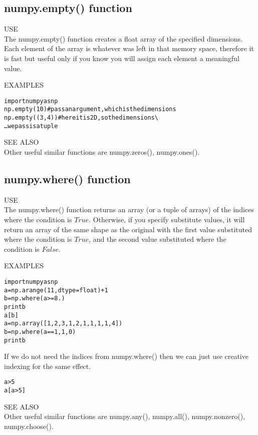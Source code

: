 \subsection{ {\sf numpy.empty() } function}
{\color{blue} {\sf\small USE}} \\
The {\sf\small numpy.empty()} function creates a float array of the
specified dimensions. Each element of the array is whatever was left
in that memory space, therefore it is fast but useful only if you know
you will assign each element a meaningful value.
  
{\color{blue} {\sf\small EXAMPLES}} 
\begin{alltt}
\pytab import numpy as np 
\pytab np.empty(10)   #pass an argument, which is the dimensions
\pytab np.empty((3,4)) #here it is 2D, so the dimensions \textbackslash
\ldots    we pass is a tuple
\end{alltt}

{\color{blue} {\sf\small SEE ALSO}} \\
Other useful similar functions are {\sf\small numpy.zeros(), numpy.ones()}.

\subsection{ {\sf numpy.where() } function}
{\color{blue} {\sf\small USE}} \\
The {\sf\small numpy.where()} function returns an array (or a tuple of
arrays) of the indices where the condition is $True$.  Otherwise, if you
specify substitute values, it will return an array of the same shape as
the original with the first value substituted where the condition is
$True$, and the second value substituted where the condition is $False$.
  
{\color{blue} {\sf\small EXAMPLES}} 
\begin{alltt}
\pytab import numpy as np
\pytab a = np.arange(11, dtype=float) + 1
\pytab b = np.where(a >= 8.) 
\pytab print b 
\pytab a[b] 
\pytab a = np.array([1,2,3,1,2,1,1,1,1,4]) 
\pytab b = np.where(a == 1, 1,0) 
\pytab print b 
\end{alltt}
If we do not need the indices from {\sf\small numpy.where()} then we
can just use creative indexing for the same effect.
\begin{alltt}
\pytab a > 5
\pytab a[a>5]
\end{alltt}

{\color{blue} {\sf\small SEE ALSO}} \\
Other useful similar functions are {\sf\small numpy.any(),
  numpy.all(), numpy.nonzero(), numpy.choose()}.
 
